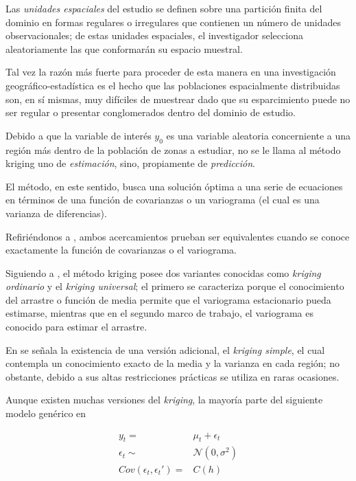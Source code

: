 \documentclass[14pt]{extarticle}
\begin{document}
Las \textit{unidades espaciales} del estudio se definen sobre una partición finita del dominio en formas regulares o irregulares que contienen un número de unidades observacionales\cite{Thompson.2012}; de estas unidades espaciales, el investigador selecciona aleatoriamente las que conformarán su espacio muestral. 

Tal vez la razón más fuerte para proceder de esta manera en una investigación geográfico-estadística es el hecho que las poblaciones espacialmente distribuidas son, en sí mismas, muy difíciles de muestrear dado que su esparcimiento puede no ser regular o presentar conglomerados dentro del dominio de estudio\cite{Benedetti.2015}.

Debido a que la variable de interés $y_0$ es una variable aleatoria concerniente a una región más dentro de la población de zonas a estudiar, no se le llama al método kriging uno de \textit{estimación}, sino, propiamente de \textit{predicción}\cite{Thompson.2012}. 

El método, en este sentido, busca una solución óptima\cite{Brus.2022} a una serie de ecuaciones en términos de una función de covarianzas o un variograma (el cual es una varianza de diferencias)\cite{Thompson.2012}. 

Refiriéndonos a \cite{Thompson.2012}, ambos acercamientos prueban ser equivalentes cuando se conoce exactamente la función de covarianzas o el variograma. 

Siguiendo a \cite{Cressie.1986}, el método kriging posee dos variantes conocidas como \textit{kriging ordinario} y el \textit{kriging universal}; el primero se caracteriza porque el conocimiento del arrastre o función de media permite que el variograma estacionario pueda estimarse, mientras que en el segundo marco de trabajo, el variograma es conocido para estimar el arrastre. 

En \cite{Benedetti.2015} se señala la existencia de una versión adicional, el \textit{kriging simple}, el cual contempla un conocimiento exacto de la media y la varianza en cada región; no obstante, debido a sus altas restricciones prácticas se utiliza en raras ocasiones. 

Aunque existen muchas versiones del \textit{kriging}, la mayoría parte del siguiente modelo genérico en \cite{Brus.2022}

\begin{align}
	y_t =& \mu_t +\epsilon_t\\
	\epsilon_t \sim& \mathcal{N}(0, \sigma^2)\\
	Cov(\epsilon_t, \epsilon_t') =& C(h)
\end{align}
 
\end{document}

